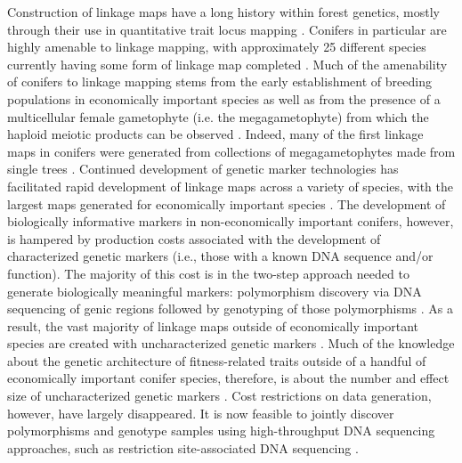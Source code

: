 \documentclass[11pt]{article}
\begin{document}
Construction of linkage maps have a long history within forest genetics, mostly through their use in quantitative trait locus 
mapping \citep{Ritland:2011}. 
Conifers in particular are highly amenable to linkage mapping, with approximately 25 different species currently having some 
form of linkage map completed \citep[see Table 5-1 in][]{Ritland:2011}. Much of the amenability of conifers to linkage mapping stems from 
the early establishment of breeding populations in economically important species as well as from the presence of a multicellular 
female gametophyte (i.e. the megagametophyte) from which the haploid meiotic products can be observed \citep{Cairney:2007}. 
Indeed, many of the first linkage maps in conifers were generated from collections of 
megagametophytes made from single trees \citep{Tulsieram:1992, Nelson:1993, Kubisiak:1996}. Continued development 
of genetic marker technologies has facilitated rapid development of linkage maps across a variety of species, with the largest maps 
generated for economically important species \citep[e.g.,][] {Achere:2004, Kang:2010, Martinez-Garcia:2013}. 
The development of biologically informative markers in non-economically important conifers, however, is hampered by production costs associated
with the development of characterized  genetic markers (i.e., those with a known DNA sequence and/or function). 
The majority of this cost is in the two-step approach needed to generate biologically 
meaningful markers: polymorphism discovery via DNA sequencing of genic regions followed by genotyping of those polymorphisms 
\citep[cf.][]{Eckert:2013a}. As a result, the vast majority of linkage maps outside of economically important 
species are created with uncharacterized genetic markers \citep[e.g.][]{Travis:1998}. Much of the knowledge about the genetic 
architecture of fitness-related traits outside of a handful of economically important conifer species, therefore, is about the 
number and effect size of uncharacterized genetic markers \citep{Ritland:2011}. Cost restrictions on data generation, however, 
have largely disappeared. It is now feasible to jointly discover polymorphisms and genotype samples using high-throughput DNA sequencing 
approaches, such as restriction site-associated DNA sequencing \citep [RADseq; e.g.,][] {Peterson:2012}. 
\end{document}

